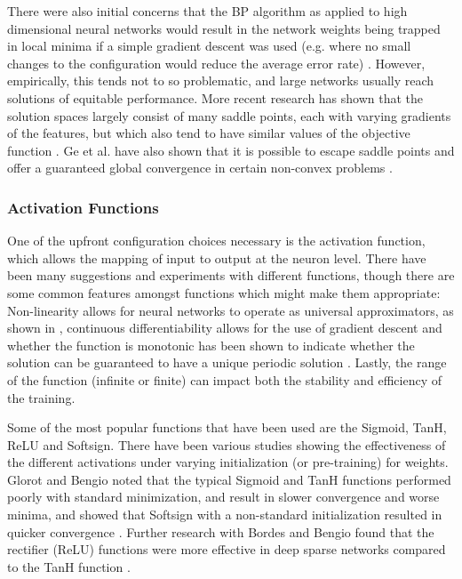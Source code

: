 \documentclass[a4paper,11pt,oneside]{article}
\theoremstyle{plain}
\theoremstyle{definition}
\begin{document}
There were also initial concerns that the BP algorithm as applied to high dimensional neural networks would result 
in the network weights being trapped in local minima if a simple gradient descent was used (e.g. where no small 
changes to the configuration would reduce the average error rate) \cite{LeCun4}. 
However, empirically, this tends not to so problematic, and large networks usually reach solutions of equitable 
performance. More recent research has shown that the solution spaces largely consist of many saddle points, each 
with varying gradients of the features, but which also tend to have similar values of the objective function \cite{Dauphin}. 
Ge et al. have also shown that it is possible to escape saddle points and offer a guaranteed global convergence 
in certain non-convex problems \cite{Ge}.
\hfill \break 

\subsubsection{Activation Functions}\label{lr_activationfunctions}

One of the upfront configuration choices necessary is the activation function, which allows the mapping of input 
to output at the neuron level. There have been many suggestions and experiments with different functions, though 
there are some common features amongst functions which might make them appropriate: Non-linearity allows for 
neural networks to operate as universal approximators, as shown in \cite{Hornik}, continuous differentiability allows for the 
use of gradient descent and whether the function is monotonic has been shown to indicate whether the solution 
can be guaranteed to have a unique periodic solution \cite{Wu}. Lastly, the range of the function (infinite or finite) can impact both the 
stability and efficiency of the training.
\hfill \break 

Some of the most popular functions that have been used are the Sigmoid, TanH, ReLU and Softsign. There have 
been various studies showing the effectiveness of the different activations under varying initialization (or pre-training) 
for weights. Glorot and Bengio noted that the typical Sigmoid and TanH functions performed poorly with standard 
minimization, and result in slower convergence and worse minima, and showed that Softsign with a non-standard 
initialization resulted in quicker convergence \cite{Glorot}. Further research with Bordes and Bengio found that the 
rectifier (ReLU) functions were  more effective in deep sparse networks compared to the TanH function \cite{Glorot2}.
\end{document}
